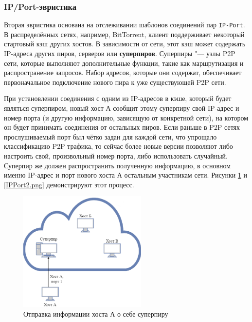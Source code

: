 \documentclass[bachelor, och, coursework]{SCWorks}
\begin{document}
\subsubsection{IP/Port-эвристика}
Вторая эвристика основана на отслеживании шаблонов соединений пар \texttt{IP-Port}. В распределённых сетях, например, BitTorrent, клиент поддерживает некоторый стартовый кэш других хостов. В зависимости от сети, этот кэш может содержать IP-адреса других пиров, серверов или \textbf{суперпиров}. Суперпиры "--- узлы P2P сети, которые выполняют дополнительные функции, такие как маршрутизация и распространение запросов. Набор адресов, которые они содержат, обеспечивает первоначальное подключение нового пира к уже существующей P2P сети.

При установлении соединения с одним из IP-адресов в кэше, который будет являться суперпиром, новый хост А сообщит этому суперпиру свой IP-адрес и номер порта (и другую информацию, зависящую от конкретной сети), на котором он будет принимать соединения от остальных пиров. Если раньше в P2P сетях прослушиваемый порт был чётко задан для каждой сети, что упрощало классификацию P2P трафика, то сейчас более новые версии позволяют либо настроить свой, произвольный номер порта, либо использовать случайный. Суперпир же должен распространить полученную информацию, в основном именно IP-адрес и порт нового хоста А остальным участникам сети. Рисунки \ref{IPPort1.png} и \ref{IPPort2.png} демонстрируют этот процесс.
\begin{figure}[H]
    \centering
    \includegraphics[width=0.57\textwidth]{IPPort1.png}
    \caption{Отправка информации хоста А о себе суперпиру}
    \label{IPPort1.png}
\end{figure}
\end{document}
